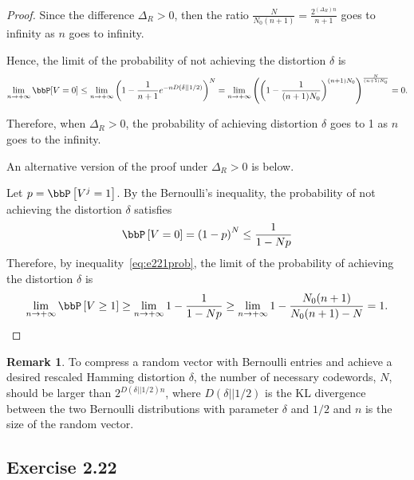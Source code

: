 \documentclass[11pt]{article}
\newcommand{\of}[1]{\left(#1\right)}
\newcommand{\off}[1]{\left[#1\right]}
\theoremstyle{plain}
\theoremstyle{definition}
\newtheorem{rmk}{Remark}
\begin{document}
\begin{proof}
 	Since the difference $\Delta_R > 0$, then the ratio $\frac{N}{N_0(n+1)} = \frac{2^{(\Delta_R) n} }{n+1}$ goes to infinity as $n$ goes to infinity. 
 	
 	 Hence, the limit of the probability of not achieving the distortion $\delta$ is
 	 \begin{equation}
 	 	\lim_{n \rightarrow +\infty} \bbP[V = 0] \leq \lim_{n \rightarrow +\infty} \of{1 - \frac{1}{n+1} e^{-nD(\delta || 1/2)}}^N = \lim_{n \rightarrow +\infty}\of{ \of{1 - \frac{1}{(n+1)N_0}}^{(n+1)N_0}}^{\frac{N}{(n+1)N_0}} = 0.
 	 \end{equation}
 	 
 	 Therefore, when $\Delta_R > 0$, the probability of achieving distortion $\delta$ goes to 1 as $n$ goes to the infinity. 
 	 
 	 \vspace{0.2cm}
 	 
 	 An alternative version of the proof under $\Delta_R > 0$ is below.
 	 
 	 \vspace{0.2cm}
 	 Let $p = \bbP \off{V^j = 1}$. By the Bernoulli's inequality, the probability of not achieving the distortion $\delta$ satisfies
 	 \begin{equation}
 	 	\bbP \off{V = 0} = \of{1 - p}^N \leq \frac{1}{1 - Np} 
 	 \end{equation}
 	  Therefore, by inequality~\eqref{eq:e221prob}, the limit of the probability of achieving the distortion $\delta$ is
 	  \begin{equation}
 	  	\lim_{n \rightarrow +\infty}  \bbP \off{V \geq 1} \geq \lim_{n \rightarrow +\infty}   1- \frac{1}{1- N p} \geq \lim_{n \rightarrow +\infty}  1 - \frac{N_0(n+1)}{N_0(n+1) - N } = 1.
 	  \end{equation}
 \end{proof}
 
 \begin{rmk}
 	To compress a random vector with Bernoulli entries and achieve a desired rescaled Hamming distortion $\delta$, the number of necessary codewords, $N$, should be larger than  $2^{D(\delta ||1/2) n}$, where $D(\delta ||1/2)$ is the KL divergence between the two Bernoulli distributions with parameter $\delta$ and $1/2$ and $n$ is the size of the random vector. 
 \end{rmk}
 
 \subsection{Exercise 2.22}
    
\end{document}
